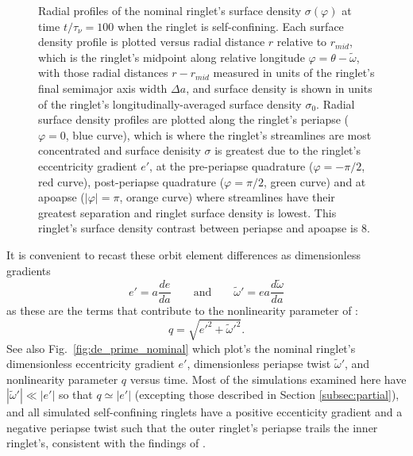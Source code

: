 \documentclass[preprint]{aastex62}
\begin{document}
\begin{figure}
    \caption{
        \label{fig:radial_sigma_nominal}
        Radial profiles of the nominal ringlet's surface density $\sigma(\varphi)$ at time $t/\tau_\nu=100$
        when the ringlet is self-confining. Each surface density profile is plotted versus radial distance $r$ 
        relative to $r_{mid}$, which is the ringlet's midpoint along relative longitude $\varphi = \theta-\tilde{\omega}$,
        with those radial distances $r - r_{mid}$ measured in units of the ringlet's final semimajor axis width $\Delta a$,
        and surface density is shown in units of the ringlet's longitudinally-averaged surface density $\sigma_0$.
        Radial surface density profiles are plotted along the ringlet's periapse ($\varphi=0$, blue curve), which is 
        where the ringlet's streamlines are most concentrated and surface denisity $\sigma$ is
        greatest due to the ringlet's eccentricity gradient $e'$, at the pre-periapse
        quadrature ($\varphi=-\pi/2$, red curve), post-periapse
        quadrature ($\varphi=\pi/2$, green curve)
        and at apoapse ($|\varphi|=\pi$, orange curve) where streamlines have their greatest separation
        and ringlet surface density is lowest. This ringlet's surface density contrast between periapse and
        apoapse is 8.
    }
\end{figure}

It is convenient to recast these orbit element differences as dimensionless gradients
\begin{equation}
    \label{eqn:e_prime}
    e' = a\frac{de}{da}
    \qquad\mbox{and}\qquad
    \tilde{\omega}' = ea\frac{d\tilde{\omega}}{da}
\end{equation}
as these are the terms that contribute to the nonlinearity parameter of \cite{BGT83}:
\begin{equation}
    \label{eqn:q}
    q = \sqrt{e'^2 + \tilde{\omega}'^2}.
\end{equation}
See also Fig.\ \ref{fig:de_prime_nominal} which plot's the nominal
ringlet's dimensionless eccentricity gradient $e'$, dimensionless periapse twist $\tilde{\omega}'$,
and nonlinearity parameter $q$ versus time. Most of the simulations examined here have
$|\tilde{\omega}'|\ll|e'|$ so that $q\simeq|e'|$ (excepting those
described in Section \ref{subsec:partial}), and all simulated self-confining ringlets
have a positive eccenticity gradient and a negative periapse twist such that
the outer ringlet's periapse trails the inner ringlet's, consistent with the findings of
\cite{BGT83}.\vfil
\end{document}

